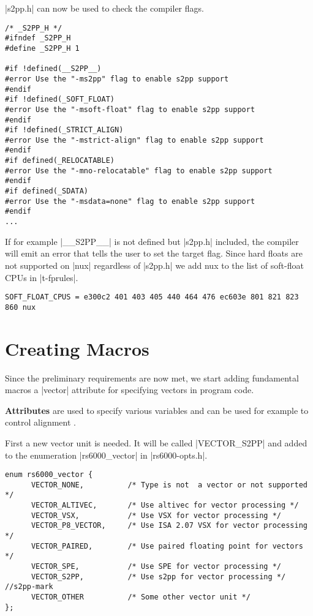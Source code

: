 |s2pp.h| can now be used to check the compiler flags.
\begin{lstlisting}
/* _S2PP_H */
#ifndef _S2PP_H
#define _S2PP_H 1

#if !defined(__S2PP__)
#error Use the "-ms2pp" flag to enable s2pp support
#endif
#if !defined(_SOFT_FLOAT)
#error Use the "-msoft-float" flag to enable s2pp support
#endif
#if !defined(_STRICT_ALIGN)
#error Use the "-mstrict-align" flag to enable s2pp support
#endif
#if defined(_RELOCATABLE)
#error Use the "-mno-relocatable" flag to enable s2pp support
#endif
#if defined(_SDATA)
#error Use the "-msdata=none" flag to enable s2pp support
#endif
...
\end{lstlisting}

If for example |__S2PP__| is not defined but |s2pp.h| included, the compiler will emit an error that tells the user to set the target flag.
Since hard floats are not supported on |nux| regardless of |s2pp.h| we add nux to the list of soft-float CPUs in |t-fprules|.
\begin{lstlisting}
SOFT_FLOAT_CPUS = e300c2 401 403 405 440 464 476 ec603e 801 821 823 860 nux
\end{lstlisting}

\section{Creating Macros}
Since the preliminary requirements are now met, we start adding fundamental macros a |vector| attribute for specifying vectors in program code.

\textbf{Attributes} are used to specify various variables and can be used for example to control alignment \citep[ch.~16.19]{GCCint}.

First a new vector unit is needed.
It will be called |VECTOR_S2PP| and added to the enumeration |rs6000_vector| in |rs6000-opts.h|.
\begin{lstlisting}
enum rs6000_vector {
      VECTOR_NONE,          /* Type is not  a vector or not supported */
      VECTOR_ALTIVEC,       /* Use altivec for vector processing */
      VECTOR_VSX,           /* Use VSX for vector processing */
      VECTOR_P8_VECTOR,     /* Use ISA 2.07 VSX for vector processing */
      VECTOR_PAIRED,        /* Use paired floating point for vectors */
      VECTOR_SPE,           /* Use SPE for vector processing */
      VECTOR_S2PP,          /* Use s2pp for vector processing */ //s2pp-mark
      VECTOR_OTHER          /* Some other vector unit */
};
\end{lstlisting}

